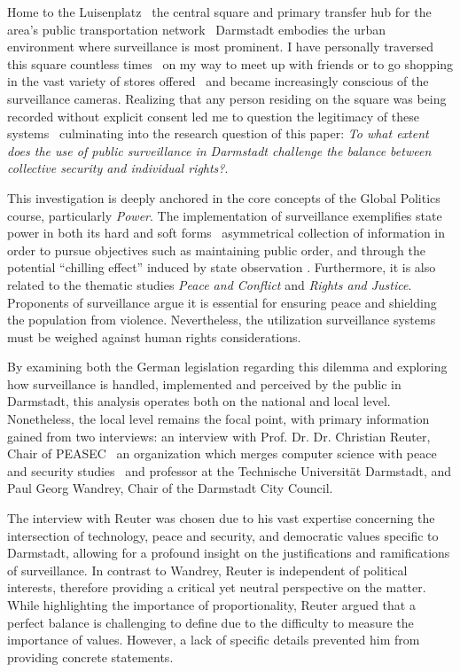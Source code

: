 \documentclass[12pt]{article}
\begin{document}
	Home to the Luisenplatz \textemdash\ the central square and primary transfer hub for the area's public transportation network \textemdash\ Darmstadt embodies the urban environment where surveillance is most prominent. I have personally traversed this square countless times \textemdash\ on my way to meet up with friends or to go shopping in the vast variety of stores offered \textemdash\ and became increasingly conscious of the surveillance cameras. Realizing that any person residing on the square was being recorded without explicit consent led me to question the legitimacy of these systems \textemdash\ culminating into the research question of this paper: \textit{To what extent does the use of public surveillance in Darmstadt challenge the balance between collective security and individual rights?}.
	
	This investigation is deeply anchored in the core concepts of the Global Politics course, particularly \textit{Power}. The implementation of surveillance exemplifies state power in both its hard and soft forms \textemdash\ asymmetrical collection of information in order to pursue objectives such as maintaining public order, and through the potential ``chilling effect'' induced by state observation \parencite{murray2024}. Furthermore, it is also related to the thematic studies \textit{Peace and Conflict} and \textit{Rights and Justice}. Proponents of surveillance argue it is essential for ensuring peace and shielding the population from violence. Nevertheless, the utilization surveillance systems must be weighed against human rights considerations.
	
	By examining both the German legislation regarding this dilemma and exploring how surveillance is handled, implemented and perceived by the public in Darmstadt, this analysis operates both on the national and local level. Nonetheless, the local level remains the focal point, with primary information gained from two interviews: an interview with Prof. Dr. Dr. Christian Reuter, Chair of PEASEC \textemdash\ an organization which merges computer science with peace and security studies \parencite{noauthor_peasec_2025} \textemdash\ and professor at the Technische Universität Darmstadt, and Paul Georg Wandrey, Chair of the Darmstadt City Council.
	
	The interview with Reuter was chosen due to his vast expertise concerning the intersection of technology, peace and security, and democratic values specific to Darmstadt, allowing for a profound insight on the justifications and ramifications of surveillance. In contrast to Wandrey, Reuter is independent of political interests, therefore providing a critical yet neutral perspective on the matter. While highlighting the importance of proportionality, Reuter argued that a perfect balance is challenging to define due to the difficulty to measure the importance of values. However, a lack of specific details prevented him from providing concrete statements.
	
\end{document}
